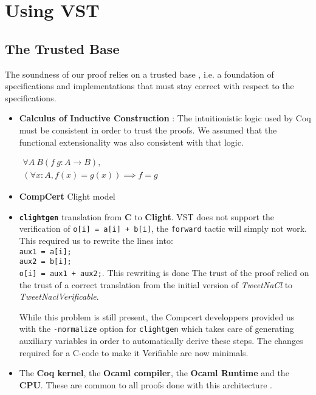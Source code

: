 \section{Using VST}

\subsection{The Trusted Base}


The soundness of our proof relies on a trusted base
, i.e. a foundation of specifications and implementations
that must stay correct with respect to the specifications.

\begin{itemize}
  \item \textbf{Calculus of Inductive Construction} : The intuitionistic logic
  used by Coq must be consistent in order to trust the proofs. We assumed that
  the functional extensionality was also consistent with that logic.

$
\begin{array}{c}
  \forall A\ B (f\ g : A \to B ),\\
  ( \forall x : A , f(x) = g(x) ) \implies f = g
\end{array}
$
  \item \textbf{CompCert} Clight model

  \item \textbf{\texttt{clightgen}} translation from \textbf{C} to
  \textbf{Clight}.
  VST does not support the verification of
  \texttt{o[i] = a[i] + b[i]}, the \texttt{forward} tactic will simply not work.
  This required us to rewrite the lines into:\\
  \texttt{aux1 = a[i];\\
  aux2 = b[i];\\
  o[i] = aux1 + aux2;}. This rewriting is done
  The trust of the proof relied on the trust of a correct translation from the
  initial version of \textit{TweetNaCl} to \textit{TweetNaclVerificable}.

  While this problem is still present, the Compcert developpers provided us with
  the \texttt{-normalize} option for \texttt{clightgen} which takes care of
  generating auxiliary variables in order to automatically derive these steps.
  The changes required for a C-code to make it Verifiable are now minimals.


  \item The \textbf{Coq kernel}, the \textbf{Ocaml compiler},
  the \textbf{Ocaml Runtime} and the \textbf{CPU}. These are common to all proofs
  done with this architecture \cite{2015-Appel,coq-faq}.
\end{itemize}

